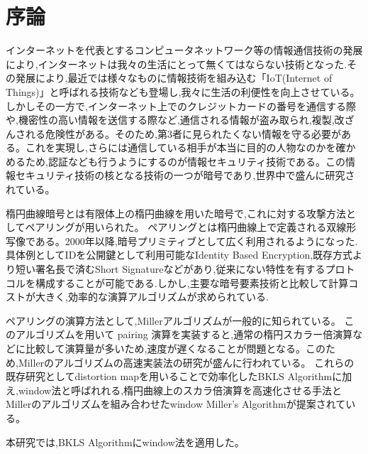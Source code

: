 \chapter{序論}
インターネットを代表とするコンピュータネットワーク等の情報通信技術の発展により,インターネットは我々の生活にとって無くてはならない技術となった.その発展により,最近では様々なものに情報技術を組み込む「IoT(Internet of Things)」と呼ばれる技術なども登場し,我々に生活の利便性を向上させている。
しかしその一方で,インターネット上でのクレジットカードの番号を通信する際や,機密性の高い情報を送信する際など,通信される情報が盗み取られ,複製,改ざんされる危険性がある。そのため,第3者に見られたくない情報を守る必要がある。これを実現し,さらには通信している相手が本当に目的の人物なのかを確かめるため,認証なども行うようにするのが情報セキュリティ技術である。この情報セキュリティ技術の核となる技術の一つが暗号であり,世界中で盛んに研究されている。

\bigskip

楕円曲線暗号とは有限体上の楕円曲線を用いた暗号で,これに対する攻撃方法としてペアリングが用いられた。
ペアリングとは楕円曲線上で定義される双線形写像である。2000年以降,暗号プリミティブとして広く利用されるようになった.具体例としてIDを公開鍵として利用可能なIdentity Based Encryption,既存方式より短い署名長で済むShort Signatureなどがあり,従来にない特性を有するプロトコルを構成することが可能である.しかし,主要な暗号要素技術と比較して計算コストが大きく,効率的な演算アルゴリズムが求められている.

\bigskip

ペアリングの演算方法として,Millerアルゴリズムが一般的に知られている。
このアルゴリズムを用いて pairing 演算を実装すると,通常の楕円スカラー倍演算などに比較して演算量が多いため,速度が遅くなることが問題となる。このため,Millerのアルゴリズムの高速実装法の研究が盛んに行われている。
これらの既存研究としてdistortion mapを用いることで効率化したBKLS Algorithmに加え,window法と呼ばれれる,楕円曲線上のスカラ倍演算を高速化させる手法とMillerのアルゴリズムを組み合わせたwindow Miller's Algorithmが提案されている。

本研究では,BKLS Algorithmにwindow法を適用した。

\bigskip

\par
